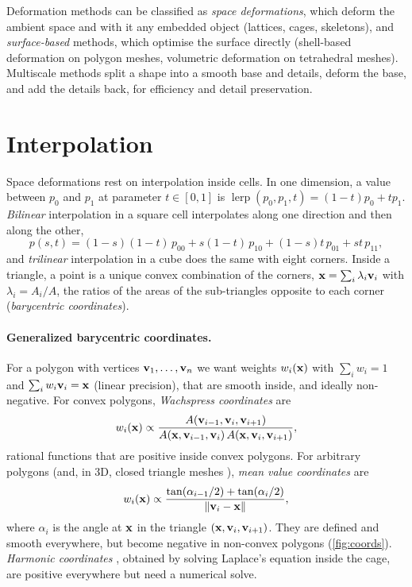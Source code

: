 Deformation methods can be classified as \emph{space deformations}, which deform the ambient
space and with it any embedded object (lattices, cages, skeletons), and \emph{surface-based}
methods, which optimise the surface directly (shell-based deformation on polygon meshes,
volumetric deformation on tetrahedral meshes). Multiscale methods split a shape into a smooth base
and details, deform the base, and add the details back, for efficiency and detail preservation.

\section{Interpolation}

Space deformations rest on interpolation inside cells. In one dimension, a value between $p_0$ and
$p_1$ at parameter $t\in[0,1]$ is $\operatorname{lerp}(p_0,p_1,t)=(1-t)p_0+tp_1$. \emph{Bilinear}
interpolation in a square cell interpolates along one direction and then along the other,
\begin{equation}
p(s,t)=(1-s)(1-t)\,p_{00}+s(1-t)\,p_{10}+(1-s)t\,p_{01}+st\,p_{11},
\end{equation}
and \emph{trilinear} interpolation in a cube does the same with eight corners. Inside a triangle, a
point is a unique convex combination of the corners, $\mathbf{x}=\sum_i\lambda_i\mathbf{v}_i$ with
$\lambda_i=A_i/A$, the ratios of the areas of the sub-triangles opposite to each corner
(\emph{barycentric coordinates}).

\paragraph{Generalized barycentric coordinates.} For a polygon with vertices $\mathbf{v}_1,\dots,\mathbf{v}_n$ we
want weights $w_i(\mathbf{x})$ with $\sum_iw_i=1$ and $\sum_iw_i\mathbf{v}_i=\mathbf{x}$ (linear precision), that are
smooth inside, and ideally non-negative. For convex polygons, \emph{Wachspress coordinates}
\citep{Wachspress1975} are
\begin{equation}
w_i(\mathbf{x})\propto\frac{A(\mathbf{v}_{i-1},\mathbf{v}_i,\mathbf{v}_{i+1})}{A(\mathbf{x},\mathbf{v}_{i-1},\mathbf{v}_i)\,A(\mathbf{x},\mathbf{v}_i,\mathbf{v}_{i+1})},
\end{equation}
rational functions that are positive inside convex polygons. For arbitrary polygons (and, in 3D,
closed triangle meshes \citep{Ju2005}), \emph{mean value coordinates} \citep{Floater2003} are
\begin{equation}
w_i(\mathbf{x})\propto\frac{\tan(\alpha_{i-1}/2)+\tan(\alpha_i/2)}{\left\lVert \mathbf{v}_i-\mathbf{x}\right\rVert},
\end{equation}
where $\alpha_i$ is the angle at $\mathbf{x}$ in the triangle $(\mathbf{x},\mathbf{v}_i,\mathbf{v}_{i+1})$. They are defined and
smooth everywhere, but become negative in non-convex polygons (\cref{fig:coords}). \emph{Harmonic
coordinates} \citep{Joshi2007}, obtained by solving Laplace's equation inside the cage, are positive
everywhere but need a numerical solve.

